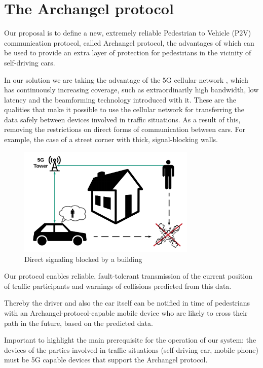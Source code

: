 \documentclass[conference]{IEEEtran}
\begin{document}
\section{The Archangel protocol}
Our proposal is to define a new, extremely reliable Pedestrian to Vehicle (P2V) communication protocol, called Archangel protocol, the advantages of which can be used to provide an extra layer of protection for pedestrians in the vicinity of self-driving cars.

In our solution we are taking the advantage of the 5G cellular network \cite{b4,b5}, which has continuously increasing coverage, such as extraordinarily high bandwidth, low latency and the beamforming technology introduced with it. These are the qualities that make it possible to use the cellular network for transferring the data safely between devices involved in traffic situations. As a result of this, removing the restrictions on direct forms of communication between cars. For example, the case of a street corner with thick, signal-blocking walls.

\begin{figure}[ht]
    \centering
    \includegraphics[width=8.5cm]{./pics/Corner.png}
    \caption{Direct signaling blocked by a building}
\end{figure}

Our protocol enables reliable, fault-tolerant transmission of the current position of traffic participants and warnings of collisions predicted from this data.

Thereby the driver and also the car itself can be notified in time of pedestrians with an Archangel-protocol-capable mobile device who are likely to cross their path in the future, based on the predicted data.

Important to highlight the main prerequisite for the operation of our system: the devices of the parties involved in traffic situations (self-driving car, mobile phone) must be 5G capable devices that support the Archangel protocol.
\end{document}
